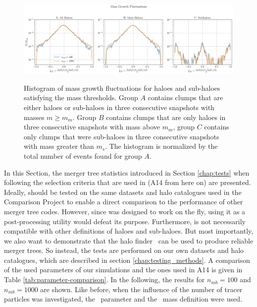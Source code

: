 \begin{figure}
	\centering
	\includegraphics[width=\textwidth, keepaspectratio]
	{figures/ACACIA/tree-statistics-sussing-threshold/mass_fluctuations-ntrace.png}\\%
	\caption{
		Histogram of mass growth fluctuations for haloes and sub-haloes satisfying the mass thresholds.
		Group $A$ contains clumps that are either haloes or sub-haloes in three consecutive snapshots with masses $m \geq m_{m}$.
		Group $B$ contains clumps that are only haloes in three consecutive snapshots with mass above $m_{m}$, group $C$ contains only clumps that were sub-haloes in three consecutive snapshots with mass greater than $m_{s}$.
		The histogram is normalized by the total number of events found for group $A$.
	}%
	\label{fig:sussing-mass-fluct}
\end{figure}




In this Section, the merger tree statistics introduced in Section \ref{chap:tests} when following
the selection criteria that are used in \citet{SUSSING_HALOFINDER} (A14 from here on) are presented.
Ideally, \acacia should be tested on the same datasets and halo catalogues used in the
Comparison Project to enable a direct comparison to the performance of other merger tree codes.
However, since \acacia was designed to work on the fly, using it as a post-processing
utility would defeat its purpose.
Furthermore, \acacia is not necessarily compatible with other definitions of haloes and
sub-haloes. But most importantly, we also want to demonstrate that the halo finder \phew\ can be
used to produce reliable merger trees. So instead, the tests are performed on our own datasets and
halo catalogues, which are described in section \ref{chap:testing_methods}. A comparison of the used
parameters of our simulations and the ones used in A14 is given in Table
\ref{tab:parameter-comparison}. In the following, the results for $n_{mb} = 100$ and $n_{mb} = 1000$
are shown. Like before, when the influence of the number of tracer particles was investigated, the
\sad\ parameter and the \exc\ mass definition were used.


